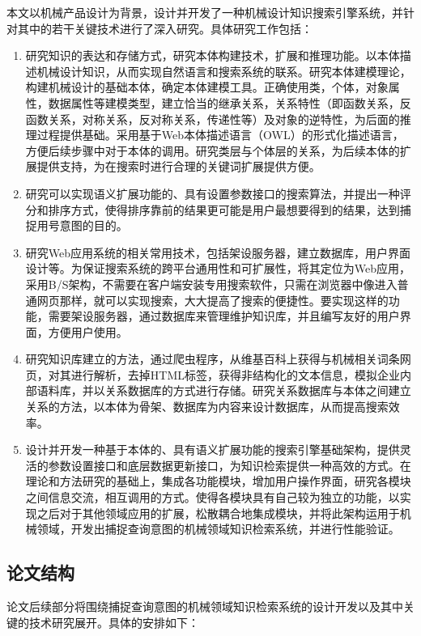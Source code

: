 \documentclass[12pt,a4paper]{article}
\begin{document}
	本文以机械产品设计为背景，设计并开发了一种机械设计知识搜索引擎系统，并针对其中的若干关键技术进行了深入研究。具体研究工作包括：
	\begin{enumerate}[(1)]
		\item
	
	研究知识的表达和存储方式，研究本体构建技术，扩展和推理功能。以本体描述机械设计知识，从而实现自然语言和搜索系统的联系。研究本体建模理论，构建机械设计的基础本体，确定本体建模工具。正确使用类，个体，对象属性，数据属性等建模类型，建立恰当的继承关系，关系特性（即函数关系，反函数关系，对称关系，反对称关系，传递性等）及对象的逆特性，为后面的推理过程提供基础。采用基于{\Times Web}本体描述语言（{\Times OWL}）的形式化描述语言，方便后续步骤中对于本体的调用。研究类层与个体层的关系，为后续本体的扩展提供支持，为在搜索时进行合理的关键词扩展提供方便。
		\item
	研究可以实现语义扩展功能的、具有设置参数接口的搜索算法，并提出一种评分和排序方式，使得排序靠前的结果更可能是用户最想要得到的结果，达到捕捉用号意图的目的。
		\item
	研究{\Times Web}应用系统的相关常用技术，包括架设服务器，建立数据库，用户界面设计等。为保证搜索系统的跨平台通用性和可扩展性，将其定位为{\Times Web}应用，采用{\Times B/S}架构，不需要在客户端安装专用搜索软件，只需在浏览器中像进入普通网页那样，就可以实现搜索，大大提高了搜索的便捷性。要实现这样的功能，需要架设服务器，通过数据库来管理维护知识库，并且编写友好的用户界面，方便用户使用。
		\item
	研究知识库建立的方法，通过爬虫程序，从维基百科上获得与机械相关词条网页，对其进行解析，去掉{\Times HTML}标签，获得非结构化的文本信息，模拟企业内部语料库，并以关系数据库的方式进行存储。研究关系数据库与本体之间建立关系的方法，以本体为骨架、数据库为内容来设计数据库，从而提高搜索效率。
		\item
	设计并开发一种基于本体的、具有语义扩展功能的搜索引擎基础架构，提供灵活的参数设置接口和底层数据更新接口，为知识检索提供一种高效的方式。在理论和方法研究的基础上，集成各功能模块，增加用户操作界面，研究各模块之间信息交流，相互调用的方式。使得各模块具有自己较为独立的功能，以实现之后对于其他领域应用的扩展，松散耦合地集成模块，并将此架构运用于机械领域，开发出捕捉查询意图的机械领域知识检索系统，并进行性能验证。
	\end{enumerate}

	\subsection{论文结构}
	论文后续部分将围绕捕捉查询意图的机械领域知识检索系统的设计开发以及其中关键的技术研究展开。具体的安排如下：
\end{document}

